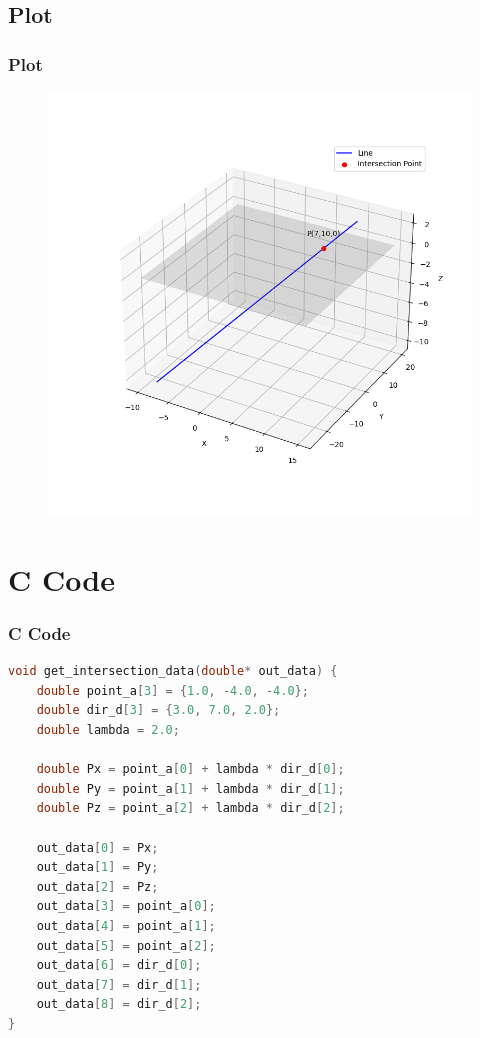 \documentclass{beamer}
\theoremstyle{remark}
\numberwithin{equation}{section}
\begin{document}
\subsection{Plot}
\begin{frame}[fragile]
\frametitle{Plot}

\begin{figure}[h!]
   \centering
   \includegraphics[width=0.7\columnwidth]{figs/fig1.png}
	\caption{}
   \label{}
\end{figure}
\end{frame}

\section{C Code}
\begin{frame}[fragile]
\frametitle{C Code}
\begin{lstlisting}[language=C]
void get_intersection_data(double* out_data) {
    double point_a[3] = {1.0, -4.0, -4.0};
    double dir_d[3] = {3.0, 7.0, 2.0};
    double lambda = 2.0;

    double Px = point_a[0] + lambda * dir_d[0]; 
    double Py = point_a[1] + lambda * dir_d[1]; 
    double Pz = point_a[2] + lambda * dir_d[2]; 
 
    out_data[0] = Px; 
    out_data[1] = Py; 
    out_data[2] = Pz;
    out_data[3] = point_a[0];
    out_data[4] = point_a[1]; 
    out_data[5] = point_a[2];
    out_data[6] = dir_d[0]; 
    out_data[7] = dir_d[1]; 
    out_data[8] = dir_d[2];
}
    \end{lstlisting}
\end{frame}
\end{document}
